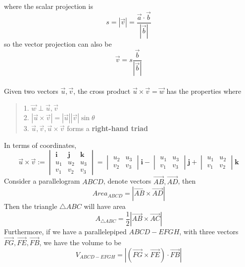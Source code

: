 where the scalar projection is
$$s = |\Vec{v}| = \frac{\Vec{a}\cdot \Vec{b}}{|\Vec{b}|}$$
so the vector projection can also be
$$\Vec{v} = s \frac{\Vec{b}}{|\Vec{b}|}$$
\\
Given two vectors $\Vec{u}, \Vec{v}$, the cross product $\Vec{u} \times \Vec{v} = \Vec{w}$ has the properties where
\begin{quote}
    1. $\Vec{w} \perp \Vec{u}, \Vec{v}$ \\
    2. $|\Vec{u} \times \Vec{v}| = |\Vec{u}| |\Vec{v}| \sin{\theta}$ \\
    3. $\Vec{u}, \Vec{v}, \Vec{u} \times \Vec{v}$ forms a \textbf{right-hand triad}
\end{quote}
In terms of coordinates, 
$$\Vec{u} \times \Vec{v} := \begin{vmatrix}
    \textbf{i} & \textbf{j} & \textbf{k} \\
    u_1 & u_2 & u_3 \\
    v_1 & v_2 & v_3
\end{vmatrix} = \begin{vmatrix}
    u_2 & u_3 \\
    v_2 & v_3
\end{vmatrix}\textbf{i} - \begin{vmatrix}
    u_1 & u_3 \\
    v_1 & v_3
\end{vmatrix}\textbf{j} + \begin{vmatrix}
    u_1 & u_2 \\
    v_1 & v_2
\end{vmatrix}\textbf{k}$$
Consider a parallelogram $ABCD$, denote vectors $\overrightarrow{AB}, \overrightarrow{AD}$, then
$$Area_{ABCD} = |\overrightarrow{AB} \times \overrightarrow{AD}|$$
Then the triangle $\triangle ABC$ will have area
$$A_{\triangle ABC} = \frac{1}{2}|\overrightarrow{AB} \times \overrightarrow{AC}|$$
Furthermore, if we have a parallelepiped $ABCD-EFGH$, with three vectors $\overrightarrow{FG}, \overrightarrow{FE}, \overrightarrow{FB}$, we have the volume to be
$$V_{ABCD-EFGH} = |(\overrightarrow{FG} \times \overrightarrow{FE}) \cdot \overrightarrow{FB}|$$

